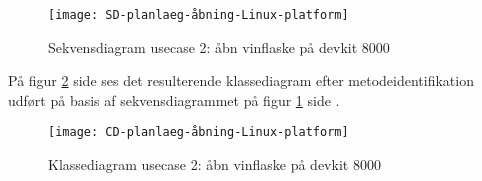 \begin{figure}[H]
	\caption{Sekvensdiagram usecase 2: åbn vinflaske på devkit 8000}
	\label{SD:UC2-devkit}
	\texttt{[image: SD-planlaeg-åbning-Linux-platform]}
\end{figure}

På figur \ref{CD:UC2-devkit} side \pageref{CD:UC2-devkit} ses det resulterende klassediagram efter metodeidentifikation udført på basis af sekvensdiagrammet på figur \ref{SD:UC2-devkit} side \pageref{SD:UC2-devkit}.
\begin{figure}[H]
	\caption{Klassediagram usecase 2: åbn vinflaske på devkit 8000}
	\label{CD:UC2-devkit}
	\texttt{[image: CD-planlaeg-åbning-Linux-platform]}
\end{figure}
